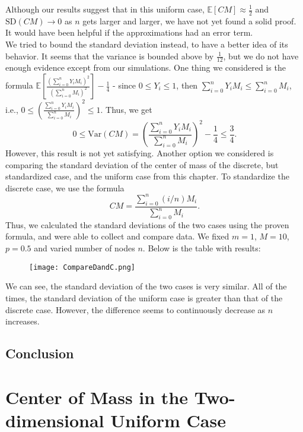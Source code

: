 \documentclass[11pt, twoside, reqno]{book}
\newcommand{\sd}{\text{SD}}
\newcommand{\Var}{\text{Var}}
\begin{document}
Although our results suggest that in this uniform case, $\mathbb{E}[CM] \approx \frac{1}{2}$ and $\sd(CM) \to 0$ as $n$ gets larger and larger, we have not yet found a solid proof. It would have been helpful if the approximations had an error term. \\
We tried to bound the standard deviation instead, to have a better idea of its behavior. It seems that the variance is bounded above by $\frac{1}{12}$, but we do not have enough evidence except from our simulations. One thing we considered is the formula $\mathbb{E}\left[\frac{\left( \sum^{n}_{i=0}Y_{i}M_{i}\right)^{2}}{\left({\sum^{n}_{i=0}M_{i}}\right)^{2}}\right] -\frac{1}{4}$ - since $0\leq Y_{i} \leq 1$, then $\sum^{n}_{i=0}Y_{i}M_{i} \leq \sum^{n}_{i=0}M_{i}$, i.e., $0 \leq \left( \frac{\sum^{n}_{i=0}Y_{i}M_{i}}{\sum^{n}_{i=0}M_{i}} \right)^{2}\leq 1$. Thus, we get 
$$0 \leq \Var(CM) = \left( \frac{\sum^{n}_{i=0}Y_{i}M_{i}}{\sum^{n}_{i=0}M_{i}} \right)^{2} - \frac{1}{4} \leq \frac{3}{4}.$$
However, this result is not yet satisfying. Another option we considered is comparing the standard deviation of the center of mass of the discrete, but standardized case, and the uniform case from this chapter. To standardize the discrete case, we use the formula 
$$CM = \frac{\sum^{n}_{i=0} (i/n) M_{i}}{\sum^{n}_{i=0}M_{i}}.$$
Thus, we calculated the standard deviations of the two cases using the proven formula, and were able to collect and compare data. We fixed $m=1$, $M=10$, $p=0.5$ and varied number of nodes $n$. Below is the table with results:

\begin{figure}[ht]
\centering
\texttt{[image: CompareDandC.png]}
\end{figure}
We can see, the standard deviation of the two cases is very similar. All of the times, the standard deviation of the uniform case is greater than that of the discrete case. However, the difference seems to continuously decrease as $n$ increases. \\

\section{Conclusion}
\label{secB8}

\chapter{Center of Mass in the Two-dimensional Uniform Case}
\label{chapC}
\end{document}
